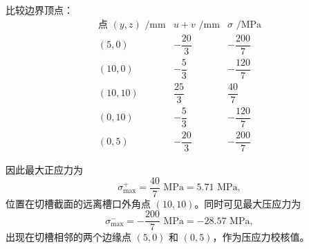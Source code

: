\documentclass[11pt,a4paper]{ctexrep}
\begin{document}
{比较边界顶点：
\[
\begin{array}{c|c|c}
\text{点 }(y,z)\text{ /mm} & u+v\text{ /mm} & \sigma\text{ /MPa}\\
\hline
(5,0) & -\dfrac{20}{3} & -\dfrac{200}{7}\\[3pt]
(10,0) & -\dfrac{5}{3} & -\dfrac{120}{7}\\[3pt]
(10,10) & \dfrac{25}{3} & \dfrac{40}{7}\\[3pt]
(0,10) & -\dfrac{5}{3} & -\dfrac{120}{7}\\[3pt]
(0,5) & -\dfrac{20}{3} & -\dfrac{200}{7}
\end{array}
\]

因此最大正应力为
\[
    \sigma_{\max}^{+}=\frac{40}{7}\text{ MPa}=5.71\text{ MPa},
\]
位置在切槽截面的远离槽口外角点 $(10,10)$。同时可见最大压应力为
\[
    \sigma_{\max}^{-}=-\frac{200}{7}\text{ MPa}=-28.57\text{ MPa},
\]
出现在切槽相邻的两个边缘点 $(5,0)$ 和 $(0,5)$，作为压应力校核值。


}
\end{document}
